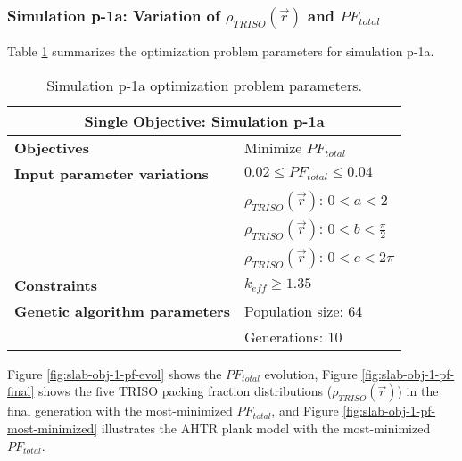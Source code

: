 \subsubsection{Simulation p-1a: Variation of $\rho_{TRISO}(\vec{r})$ and $PF_{total}$}
Table \ref{tab:simulationp1a} summarizes the optimization problem parameters for 
simulation p-1a. 
\begin{table}[htbp!]
    \centering
    \onehalfspacing
    \caption{Simulation p-1a optimization problem parameters.}
	\label{tab:simulationp1a}
    \footnotesize
    \begin{tabular}{l|p{4cm}}
    \hline 
    \multicolumn{2}{c}{\textbf{Single Objective: Simulation p-1a}} \\
    \hline 
    \textbf{Objectives} & Minimize $PF_{total}$ \\
    \hline 
    \textbf{Input parameter variations} & $0.02 \leq PF_{total} \leq 0.04$ \\
    & $\rho_{TRISO}(\vec{r})$: $0<a<2$ \\
    & $\rho_{TRISO}(\vec{r})$: $0<b<\frac{\pi}{2}$ \\
    & $\rho_{TRISO}(\vec{r})$: $0<c<2\pi$ \\
    \hline
    \textbf{Constraints} & $k_{eff} \geq 1.35$\\ 
    \hline 
    \textbf{Genetic algorithm parameters} & Population size: 64 \\
    & Generations: 10 \\
    \hline
    \end{tabular}
\end{table}
Figure \ref{fig:slab-obj-1-pf-evol} shows the $PF_{total}$ evolution,  
Figure \ref{fig:slab-obj-1-pf-final} shows the five TRISO packing fraction 
distributions ($\rho_{TRISO}(\vec{r})$) in the final generation with the 
most-minimized $PF_{total}$, and Figure \ref{fig:slab-obj-1-pf-most-minimized} 
illustrates the \gls{AHTR} plank model with the most-minimized $PF_{total}$.
